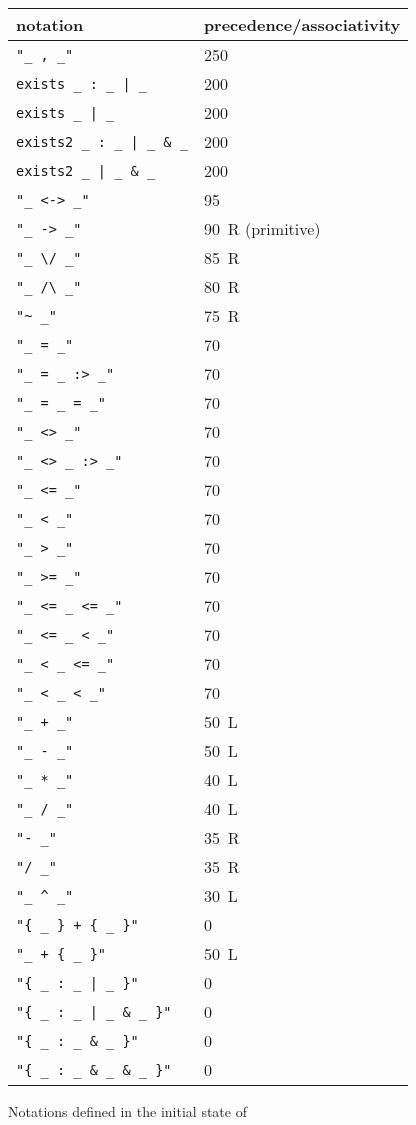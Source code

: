 \begin{figure}
\label{coq-symbols}
\begin{center}
\begin{tabular}{|l|l|}
\hline
notation & precedence/associativity \\
\hline
\verb$"_ , _"$ & 250 \\
\verb$exists _ : _ | _$ & 200 \\
\verb$exists _ | _$ & 200 \\
\verb$exists2 _ : _ | _ & _$ & 200 \\
\verb$exists2 _ | _ & _$ & 200 \\
\verb$"_ <-> _"$ & 95 \\
\verb$"_ -> _"$ & 90\, R (primitive) \\
\verb$"_ \/ _"$ & 85\, R \\
\verb$"_ /\ _"$ & 80\, R \\
\verb$"~ _"$    & 75\, R \\
\verb$"_ = _"$  & 70 \\
\verb$"_ = _ :> _"$  & 70 \\
\verb$"_ = _ = _"$  & 70 \\
\verb$"_ <> _"$  & 70 \\
\verb$"_ <> _ :> _"$  & 70 \\
\verb$"_ <= _"$ & 70 \\
\verb$"_ < _"$  & 70 \\
\verb$"_ > _"$  & 70 \\
\verb$"_ >= _"$ & 70 \\
\verb$"_ <= _ <= _"$ & 70 \\
\verb$"_ <= _ < _"$ & 70 \\
\verb$"_ < _ <= _"$ & 70 \\
\verb$"_ < _ < _"$ & 70 \\
\verb$"_ + _"$  & 50\, L \\
\verb$"_ - _"$  & 50\, L \\
\verb$"_ * _"$  & 40\, L \\
\verb$"_ / _"$  & 40\, L \\
\verb$"- _"$  & 35\, R \\
\verb$"/ _"$  & 35\, R \\
\verb$"_ ^ _"$  & 30\, L \\
\verb$"{ _ } + { _ }"$ & 0 \\
\verb$"_ + { _ }"$  & 50\, L \\
\verb$"{ _ : _ | _ }"$ & 0 \\
\verb$"{ _ : _ | _ & _ }"$ & 0 \\
\verb$"{ _ : _ & _ }"$ & 0 \\
\verb$"{ _ : _ & _ & _ }"$ & 0 \\
\hline
\end{tabular}
\end{center}
\caption{Notations defined in the initial state of {\Coq}}
\end{figure}

